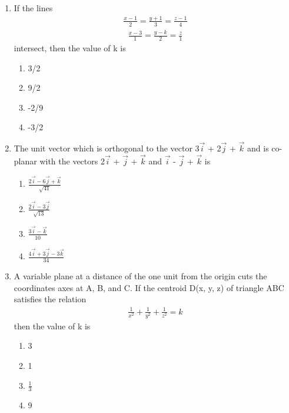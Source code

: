 \begin{enumerate}[label=\arabic*.,ref=\thesubsection.\theenumi]
\item If the lines 
\begin{align*}
\frac{x - 1}{2} = \frac{y + 1}{3} = \frac{z - 1}{4}
\end{align*}
\begin{align*}
\frac{x - 3}{1} = \frac{y - k}{2} = \frac{z}{1}
\end{align*}
intersect, then the value of k is
\begin{enumerate}
\item 3/2
\item 9/2
\item -2/9
\item -3/2
\end{enumerate}

\item The unit vector which is orthogonal to the vector 3$\overrightarrow{i}$ + 2$\overrightarrow{j}$ + $\overrightarrow{k}$ and is co-planar with the vectors 2$\overrightarrow{i}$ + $\overrightarrow{j}$ + $\overrightarrow{k}$ and $\overrightarrow{i}$ - $\overrightarrow{j}$ + $\overrightarrow{k}$ is
\begin{enumerate}
\item $\frac{2\overrightarrow{i} - 6\overrightarrow{j} + \overrightarrow{k}}{\sqrt{41}}$
\item $\frac{2\overrightarrow{i} - 3\overrightarrow{j}}{\sqrt{13}}$
\item $\frac{3\overrightarrow{i} - \overrightarrow{k}}{10}$
\item $\frac{4\overrightarrow{i} + 3\overrightarrow{j} - 3\overrightarrow{k}}{34}$
\end{enumerate}

\item A variable plane at a distance of the one unit from the origin cuts the coordinates axes at A, B, and C. If the centroid D(x, y, z) of triangle ABC satisfies the relation
\begin{align*}
\frac{1}{x^{2}} + \frac{1}{y^{2}} + \frac{1}{z^{2}} = k
\end{align*}
then the value of k is
\begin{enumerate}
\item 3
\item 1
\item $\frac{1}{3}$
\item 9
\end{enumerate}


\end{enumerate}
